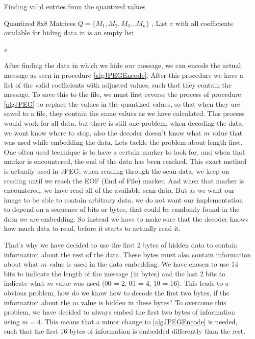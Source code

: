 \begin{algorithm}
\caption{Finding valid entries from the quantized values}
\label{algJPEG}
\begin{algorithmic}
\REQUIRE Quantized 8x8 Matrices $Q = \{ M_1, M_2, M_3 \ldots M_n \}$ ,
\ENSURE List $v$ with all coefficients available for hiding data in
 is an empty list

			\ENDIF
		\ENDFOR
	\ENDFOR
\ENDFOR

\RETURN $v$
\end{algorithmic}
\end{algorithm}

After finding the data in which we hide our message, we can encode the actual message as seen in procedure \ref{algJPEGEncode}. 
After this procedure we have a list of the valid coefficients with adjusted values, such that they contain the message. 
To save this to the file, we must first reverse the process of procedure \ref{algJPEG} to replace the values in the quantized values, so that when they are saved to a file, they contain the same values as we have calculated. 
This process would work for all data, but there is still one problem, when decoding the data, we wont know where to stop, also the decoder doesn't know what $m$ value that was used while embedding the data. 
Lets tackle the problem about length first. 
One often used technique is to have a certain marker to look for, and when that marker is encountered, the end of the data has been reached. 
This exact method is actually used in JPEG; when reading through the scan data, we keep on reading until we reach the EOF (End of File) marker. 
And when that marker is encountered, we have read all of the available scan data. 
But as we want our image to be able to contain arbitrary data, we do not want our implementation to depend on a sequence of bits or bytes, that could be randomly found in the data we are embedding. 
So instead we have to make sure that the decoder knows how much data to read, before it starts to actually read it. 

That's why we have decided to use the first 2 bytes of hidden data to contain information about the rest of the data. 
These bytes must also contain information about what $m$ value is used in the data embedding. 
We have chosen to use 14 bits to indicate the length of the message (in bytes) and the last 2 bits to indicate what $m$ value was used (00 = 2, 01 = 4, 10 = 16). 
This leads to a obvious problem, how do we know how to decode the first two bytes, if the information about the $m$ value is hidden in these bytes? To overcome this problem, we have decided to always embed the first two bytes of information using $m = 4$. 
This means that a minor change to \ref{algJPEGEncode} is needed, such that the first 16 bytes of information is embedded differently than the rest.

